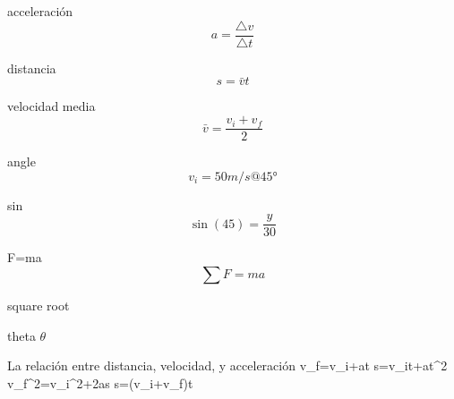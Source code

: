 
acceleración
\[ a=\frac{\triangle{v}}{\triangle{t}} \]

distancia
\[ s=\bar{v}t \]

velocidad media
\[ \bar{v} = \frac{v_i+v_f}{2} \]

angle
\[ v_i=50m/s @ \ang{45} \]

sin
\[ \sin(45)=\frac{y}{30} \]

F=ma
\[ \sum F=ma \]

square root
\sqrt{}

theta
$\theta$

La relación entre distancia, velocidad, y acceleración
v_f=v_i+at
s=v_it+at^2
v_f^2=v_i^2+2as
s=(v_i+v_f)t
